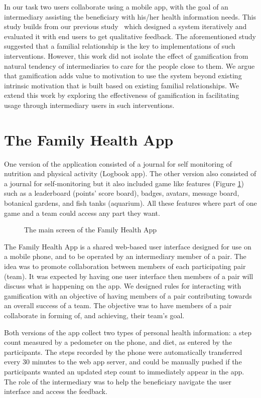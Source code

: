 \documentclass{sig-alternate}
\begin{document}
In our task two users collaborate using a mobile app, with the goal of an intermediary assisting the beneficiary with his/her health information needs. This study builds from our previous study~\cite{katule2016:leveraging} which designed a system iteratively and evaluated it with end users to get qualitative feedback. The aforementioned study suggested that a familial relationship is the key to implementations of such interventions. However, this work did not isolate the effect of gamification from natural tendency of intermediaries to care for the people close to them. We argue that gamification adds value to motivation to use the system beyond existing intrinsic motivation that is built based on existing familial relationships. We extend this work by exploring the effectiveness of gamification in facilitating usage through intermediary users in such interventions.

\section{The Family Health App}\label{gamfeatures}
One version of the application consisted of a journal for self monitoring of nutrition and physical activity (Logbook app). The other version also consisted of a journal for self-monitoring but it also included game like features (Figure \ref{figure:gameapp}) such as a leaderboard (points' score board), badges, avatars, message board, botanical gardens, and fish tanks (aquarium). All these features where part of one game and a team could access any part they want. 

\begin{figure}[H]
\centering
{}
\caption{The main screen of the Family Health App}
\label{figure:gameapp}
\end{figure}

The Family Health App is a shared web-based user interface designed for use on a mobile phone, and to be operated by an intermediary member of a pair. The idea was to promote collaboration between members of each participating pair (team). It was expected by having one user interface then members of a pair will discuss what is happening on the app. We designed rules for interacting with gamification with an objective of having members of a pair contributing towards an overall success of a team. The objective was to have members of a pair collaborate in forming of, and achieving, their team's goal. 

Both versions of the app collect two types of personal health information: a step count measured by a pedometer on the phone, and diet, as entered by the participants. The steps recorded by the phone were automatically transferred every 30 minutes to the web app server, and could be manually pushed if the participants wanted an updated step count to immediately appear in the app.  The role of the intermediary was to help the beneficiary navigate the user interface and access the feedback.
\end{document}
